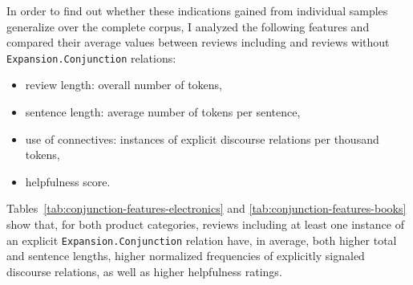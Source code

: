 \documentclass[
    a4paper,%
    12pt,%
    oneside,%
    toc=bibliography,
    final,
]{scrartcl}
\begin{document}
In order to find out whether these indications gained from individual samples generalize over the complete corpus, I analyzed the following features and compared their average values between reviews including and reviews without \lstinline|Expansion.Conjunction| relations:

\begin{itemize}
\item review length: overall number of tokens,
\item sentence length: average number of tokens per sentence,
\item use of connectives: instances of explicit discourse relations per thousand tokens,
\item helpfulness score.
\end{itemize}

Tables~\ref{tab:conjunction-features-electronics} and \ref{tab:conjunction-features-books} show that, for both product categories, reviews including at least one instance of an explicit \lstinline|Expansion.Conjunction| relation have, in average, both higher total and sentence lengths, higher normalized frequencies of explicitly signaled discourse relations, as well as higher helpfulness ratings.


\begin{table}[h!]
	\centering
	
	\caption{Comparison of selected linguistic features between reviews including and reviews without \lstinline|Expansion.Conjunction| relations in electronics reviews}
	\label{tab:conjunction-features-electronics}
	
	\begin{threeparttable}
	\renewcommand{\arraystretch}{1.5}
	
	\end{threeparttable}

\end{table}
\end{document}
